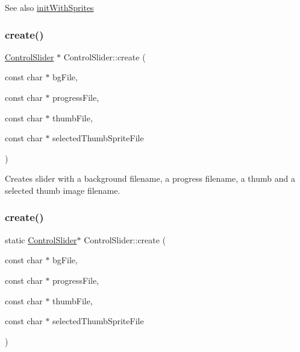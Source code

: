 \begin{DoxySeeAlso}{See also}
\hyperlink{classControlSlider_ad0ff5ce559475048d32b4406a0930da1}{init\+With\+Sprites} 
\end{DoxySeeAlso}
\mbox{\label{classControlSlider_a6e57ca5a50445b6d43caab83cde335fe}} 
\subsubsection{\texorpdfstring{create()}{create()}\hspace{0.1cm}{\footnotesize\ttfamily [5/8]}}
{\footnotesize\ttfamily \hyperlink{classControlSlider}{Control\+Slider} $\ast$ Control\+Slider\+::create (\begin{DoxyParamCaption}\item[{const char $\ast$}]{bg\+File,  }\item[{const char $\ast$}]{progress\+File,  }\item[{const char $\ast$}]{thumb\+File,  }\item[{const char $\ast$}]{selected\+Thumb\+Sprite\+File }\end{DoxyParamCaption})\hspace{0.3cm}{\ttfamily [static]}}

Creates slider with a background filename, a progress filename, a thumb and a selected thumb image filename. \mbox{\label{classControlSlider_a827baf7d006d93aad3f0ad395c066a67}} 
\subsubsection{\texorpdfstring{create()}{create()}\hspace{0.1cm}{\footnotesize\ttfamily [6/8]}}
{\footnotesize\ttfamily static \hyperlink{classControlSlider}{Control\+Slider}$\ast$ Control\+Slider\+::create (\begin{DoxyParamCaption}\item[{const char $\ast$}]{bg\+File,  }\item[{const char $\ast$}]{progress\+File,  }\item[{const char $\ast$}]{thumb\+File,  }\item[{const char $\ast$}]{selected\+Thumb\+Sprite\+File }\end{DoxyParamCaption})\hspace{0.3cm}{\ttfamily [static]}}

